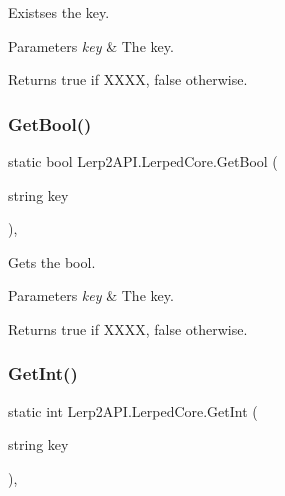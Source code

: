 Existses the key. 


\begin{DoxyParams}{Parameters}
{\em key} & The key.\\
\hline
\end{DoxyParams}
\begin{DoxyReturn}{Returns}
{\ttfamily true} if X\+X\+XX, {\ttfamily false} otherwise.
\end{DoxyReturn}
\mbox{\label{class_lerp2_a_p_i_1_1_lerped_core_a561a69b0d322804e7d08899b584188df}} 
\subsubsection{\texorpdfstring{Get\+Bool()}{GetBool()}}
{\footnotesize\ttfamily static bool Lerp2\+A\+P\+I.\+Lerped\+Core.\+Get\+Bool (\begin{DoxyParamCaption}\item[{string}]{key }\end{DoxyParamCaption})\hspace{0.3cm}{\ttfamily [inline]}, {\ttfamily [static]}}



Gets the bool. 


\begin{DoxyParams}{Parameters}
{\em key} & The key.\\
\hline
\end{DoxyParams}
\begin{DoxyReturn}{Returns}
{\ttfamily true} if X\+X\+XX, {\ttfamily false} otherwise.
\end{DoxyReturn}
\mbox{\label{class_lerp2_a_p_i_1_1_lerped_core_ac6a20617421e0b788afb91f189986d57}} 
\subsubsection{\texorpdfstring{Get\+Int()}{GetInt()}}
{\footnotesize\ttfamily static int Lerp2\+A\+P\+I.\+Lerped\+Core.\+Get\+Int (\begin{DoxyParamCaption}\item[{string}]{key }\end{DoxyParamCaption})\hspace{0.3cm}{\ttfamily [inline]}, {\ttfamily [static]}}




